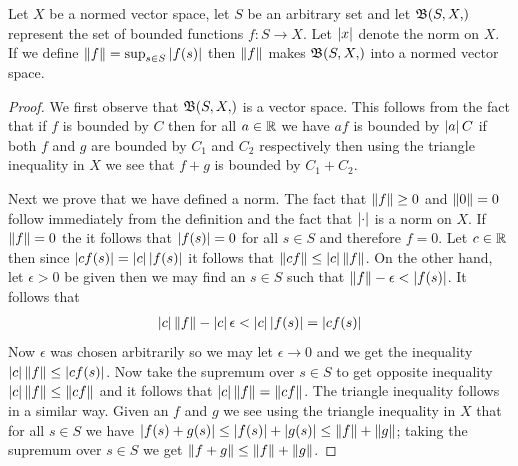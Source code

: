 \begin{prop}Let $X$ be a normed vector space, let $S$ be an arbitrary
  set and let $\sboundedfunctions{S, X}$
  represent the set of bounded functions $f : S \to X$.  Let
  $\left \vert x \right \vert$ denote the norm on $X$.  If we
  define $\left \lVert f \right \rVert = \sup_{s \in S} \left \vert f(s) \right \vert$ then $\left \lVert f \right \rVert$
  makes $\sboundedfunctions{S, X}$ into a normed vector space.
\end{prop}
\begin{proof}
We first observe that $\sboundedfunctions{S, X}$ is a vector space.  
This follows from the fact that if $f$ is bounded by $C$ then for all
$a \in \mathbb{R}$ we have $af$ is bounded by $\left \vert a \right \vert C$ if both $f$ and
$g$ are bounded by $C_1$ and $C_2$ respectively then using the
triangle inequality in $X$ we see that $f+g$ is bounded by $C_1 + C_2$.

Next we prove that we have defined a norm.  The fact that $\left \lVert f \right \rVert
\geq 0$ and $\left \lVert 0 \right \rVert =0$ follow immediately from the definition and
the fact that $\left \vert \cdot \right \vert$ is a norm on $X$.   If $\left \lVert f \right \rVert
= 0$ the it follows that $\left \vert f(s) \right \vert = 0$ for all $s \in S$
and therefore $f=0$.  Let $c \in \mathbb{R}$ then since $\left \vert cf(s) \right \vert =
\left \vert c \right \vert \left \vert f(s) \right \vert$ it follows that $\left \lVert cf \right \rVert \leq \left \vert c \right \vert\left \lVert f \right \rVert$.
On the other hand, let $\epsilon > 0$ be given then we may find an $s
\in S$
such that $\left \lVert f \right \rVert - \epsilon < \left \vert f(s) \right \vert$.  It follows that 
\begin{align*}
\left \vert c \right \vert \left \lVert f \right \rVert - \left \vert c \right \vert \epsilon < \left \vert c \right \vert \left \vert f(s) \right \vert = \left \vert cf(s) \right \vert
\end{align*}
Now $\epsilon$ was chosen arbitrarily so we may let $\epsilon \to 0$
and we get the inequality $\left \vert c \right \vert \left \lVert f \right \rVert \leq
\left \vert cf(s) \right \vert$.  Now take the supremum over $s \in S$ to get opposite
inequality $\left \vert c \right \vert \left \lVert f \right \rVert \leq \left \lVert cf \right \rVert$ and it follows that
$\left \vert c \right \vert \left \lVert f \right \rVert = \left \lVert cf \right \rVert$.  The triangle inequality follows in a
similar way.  Given an $f$ and $g$ we see using the triangle
inequality in $X$ that for all $s \in S$ we
have $\left \vert f(s) + g(s) \right \vert \leq \left \vert f(s) \right \vert + \left \vert g(s) \right \vert \leq \left \lVert f \right \rVert
+\left \lVert g \right \rVert$; taking the supremum over $s \in S$ we get $\left \lVert f+g \right \rVert \leq
\left \lVert f \right \rVert + \left \lVert g \right \rVert$.
\end{proof}


